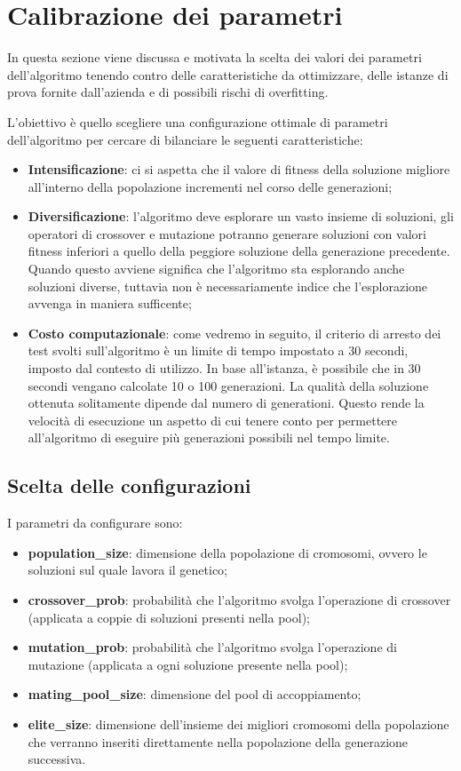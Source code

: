 \section{Calibrazione dei parametri}

In questa sezione viene discussa e motivata la scelta dei valori dei parametri dell'algoritmo tenendo contro delle caratteristiche da ottimizzare, delle istanze di prova fornite dall'azienda e di possibili rischi di overfitting.

L'obiettivo è quello scegliere una configurazione ottimale di parametri dell'algoritmo per cercare di bilanciare le seguenti caratteristiche:
\begin{itemize}
	\item\textbf{Intensificazione}: ci si aspetta che il valore di fitness della soluzione migliore all'interno della popolazione incrementi nel corso delle generazioni;
	\item\textbf{Diversificazione}: l'algoritmo deve esplorare un vasto insieme di soluzioni, gli operatori di crossover e mutazione potranno generare soluzioni con valori fitness inferiori a quello della peggiore soluzione della generazione precedente. Quando questo avviene significa che l'algoritmo sta esplorando anche soluzioni diverse, tuttavia non è necessariamente indice che l'esplorazione avvenga in maniera sufficente;
	\item\textbf{Costo computazionale}: come vedremo in seguito, il criterio di arresto dei test svolti sull'algoritmo è un limite di tempo impostato a 30 secondi, imposto dal contesto di utilizzo. In base all'istanza, è possibile che in 30 secondi vengano calcolate 10 o 100 generazioni. La qualità della soluzione ottenuta solitamente dipende dal numero di generationi. Questo rende la velocità di esecuzione un aspetto di cui tenere conto per permettere all'algoritmo di eseguire più generazioni possibili nel tempo limite.
\end{itemize}

\subsection{Scelta delle configurazioni}

I parametri da configurare sono:
\begin{itemize}
	\item\textbf{population\_size}: dimensione della popolazione di cromosomi, ovvero le soluzioni sul quale lavora il genetico;
	\item\textbf{crossover\_prob}: probabilità che l'algoritmo svolga l'operazione di crossover (applicata a coppie di soluzioni presenti nella pool);
	\item\textbf{mutation\_prob}: probabilità che l'algoritmo svolga l'operazione di mutazione (applicata a ogni soluzione presente nella pool);
	\item\textbf{mating\_pool\_size}: dimensione del pool di accoppiamento;
	\item\textbf{elite\_size}: dimensione dell'insieme dei migliori cromosomi della popolazione che verranno inseriti direttamente nella popolazione della generazione successiva.
\end{itemize}

